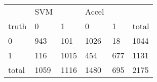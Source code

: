 \begin{tabular}{|l|ll|ll|l|}
 & SVM & & Accel & & \\
truth & 0 & 1 & 0 & 1 & total \\ \hline
  0 &   943 & 101 &   1026 & 18  & 1044 \\
  1 &   116 & 1015 &  454  & 677 & 1131 \\
\hline
total & 1059 & 1116 & 1480 & 695 & 2175 \\
\hline
\end{tabular}

